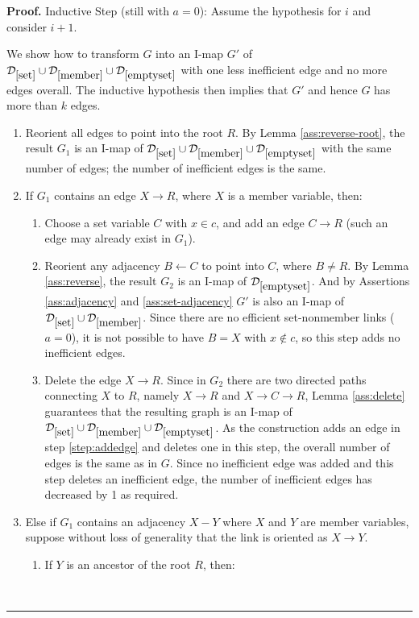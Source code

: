 \documentclass{elsarticle}%
\renewenvironment{proof}[1][Proof]{\noindent\textbf{#1.} }{\ \rule{0.5em}{0.5em}}
\newcommand{\B}{B}
\newcommand{\R}{R}
\newcommand{\X}{X}
\newcommand{\Y}{Y}
\newcommand{\C}{C}
\newcommand{\G}{G}
\newcommand{\D}{\mathcal{D}}
\renewcommand{\c}{c}
\newcommand{\x}{x}
\begin{document}
\begin{proof}
Inductive Step (still with $a = 0$): Assume the hypothesis for $i$ and consider $i+1$. 

We show how to transform $\G$ into an I-map $\G'$ of $\D_{\ref{set}}\cup \D_{\ref{member}}\cup
\D_{\ref{emptyset}}$ with one less inefficient edge and no more edges overall. The inductive hypothesis then implies that $\G'$ and hence $\G$ has more than $k$ edges. 

\begin{enumerate}
\item Reorient all edges to point into the root $\R$. By Lemma \ref{ass:reverse-root}, the result $\G_1$ is an I-map of $\D_{\ref{set}}\cup \D_{\ref{member}}\cup
\D_{\ref{emptyset}}$ with the same number of edges; the number of inefficient edges is the same.
\item If $\G_1$ contains an edge $\X \rightarrow \R$, where $\X$ is a member variable, then: 
\label{step:member-root}
\begin{enumerate}
\item Choose a set variable $\C$ with $\x \in \c$, and add an edge $\C \rightarrow \R$ (such an edge may already exist in $\G_1$). \label{step:addedge}
\item Reorient any adjacency $\B \leftarrow \C$ to point into $\C$, where $\B \neq \R$. By Lemma \ref{ass:reverse}, the result $\G_2$ is  an I-map of $\D_{\ref{emptyset}}$. And by Assertions \ref{ass:adjacency} and \ref{ass:set-adjacency} $\G'$ is also an I-map of $\D_{\ref{set}}\cup \D_{\ref{member}}$. Since there are no efficient set-nonmember links ($a=0$), it is not possible to have $\B = \X$ with $\x \not\in \c$, so this step adds no inefficient edges. \label{steporient}

\item Delete the edge $\X \rightarrow \R$. Since in $\G_2$ there are two directed paths connecting $\X$ to $\R$, namely $\X \rightarrow  \R$ and $\X \rightarrow \C \rightarrow \R$, Lemma \ref{ass:delete} guarantees that the resulting graph is an I-map of $\D_{\ref{set}}\cup \D_{\ref{member}}\cup
\D_{\ref{emptyset}}$. As the construction adds an edge in step \ref{step:addedge} and deletes one in this step, the overall number of edges is the same as in $\G$. Since no inefficient edge was added and this step deletes an inefficient edge, the number of inefficient edges has decreased by 1 as required. 
\end{enumerate}
\item Else if $\G_1$ contains an adjacency $\X - \Y$ where $\X$ and $\Y$ are member variables, suppose without loss of generality that the link is oriented as $\X \rightarrow \Y$. \label{step:members}
\begin{enumerate}
\item If $\Y$ is an ancestor of the root $\R$, then:


\end{enumerate}
\end{enumerate}
\end{proof}
\end{document}
